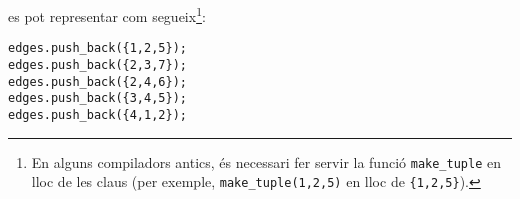 \begin{samepage}
es pot representar com segueix\footnote{En alguns compiladors
antics, és necessari fer servir la funció \texttt{make\_tuple} en lloc de
les claus (per exemple, \texttt{make\_tuple(1,2,5)} en lloc de
\texttt{\{1,2,5\}}).}:  
\begin{lstlisting}
edges.push_back({1,2,5});
edges.push_back({2,3,7});
edges.push_back({2,4,6});
edges.push_back({3,4,5});
edges.push_back({4,1,2});
\end{lstlisting}
\end{samepage}


